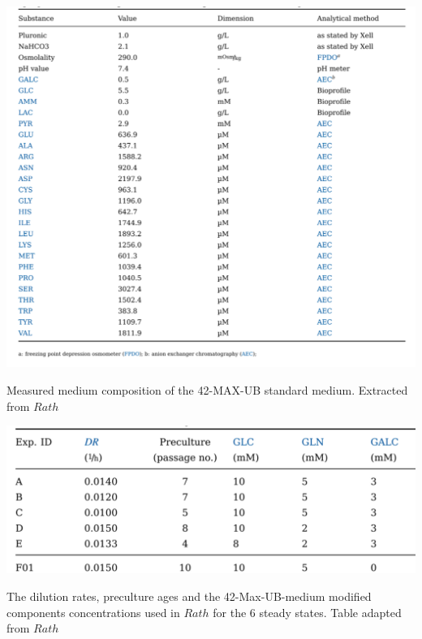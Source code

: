 \documentclass[]{article}
\begin{document}
	 \begin{table}
	 	\includegraphics[scale = 0.7]{Table_3_1}
	 	\caption{Measured medium composition of the 42-MAX-UB standard medium. Extracted from $Rath$}
	 	
	 \end{table}
	 
	 \begin{table}
	 	\includegraphics[scale = 0.7]{Table_4_10}
	 	\caption{The dilution rates, preculture ages and the 42-Max-UB-medium modified components concentrations used in $Rath$ for the 6 steady states. Table adapted from $Rath$}
	 	
	 \end{table}
\end{document}
